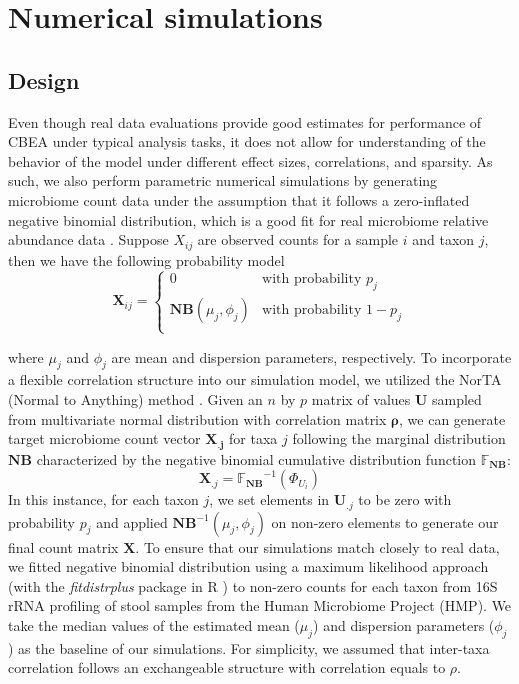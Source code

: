 \section{Numerical simulations}
\subsection{Design}
Even though real data evaluations provide good estimates for performance of CBEA under typical analysis tasks, it does not allow for understanding of the behavior of the model under different effect sizes, correlations, and sparsity. As such, we also perform parametric numerical simulations by generating microbiome count data under the assumption that it follows a zero-inflated negative binomial distribution, which is a good fit for real microbiome relative abundance data \cite{calgaro2020assessment}. Suppose $X_{ij}$ are observed counts for a sample $i$ and taxon $j$, then we have the following probability model
\begin{equation}
    \mathbf{X}_{ij} =
      \begin{cases}
        0 & \text{with probability $p_j$}\\
        \mathbf{NB}(\mu_j, \phi_j) & \text{with probability $1 - p_j$}\\
      \end{cases}       
\end{equation}

where $\mu_j$ and $\phi_j$ are mean and dispersion parameters, respectively. To incorporate a flexible correlation structure into our simulation model, we utilized the NorTA (Normal to Anything) method \cite{cario1997modeling}. Given an $n$ by $p$ matrix of values $\mathbf{U}$ sampled from multivariate normal distribution with correlation matrix $\mathbf{\rho}$, we can generate target microbiome count vector $\mathbf{X_{.j}}$ for taxa $j$ following the marginal distribution $\mathbf{NB}$ characterized by the negative binomial cumulative distribution function $\mathbb{F_{\mathbf{NB}}}$:
\begin{equation}
    \mathbf{X}_{.j} = \mathbb{F_{\mathbf{NB}}}^{-1}(\Phi_{U_i})
\end{equation}
In this instance, for each taxon $j$, we set elements in $\mathbf{U}_{.j}$ to be zero with probability $p_j$ and applied $\mathbf{NB}^{-1}(\mu_j, \phi_j)$ on non-zero elements to generate our final count matrix $\mathbf{X}$. To ensure that our simulations match closely to real data, we fitted negative binomial distribution using a maximum likelihood approach (with the \emph{fitdistrplus} package in R \cite{delignette-muller2015fitdistrplus}) to non-zero counts for each taxon from 16S rRNA profiling of stool samples from the Human Microbiome Project (HMP). We take the median values of the estimated mean ($\mu_j$) and dispersion parameters ($\phi_j$) as the baseline of our simulations. For simplicity, we assumed that inter-taxa correlation follows an exchangeable structure with correlation equals to $\rho$.

